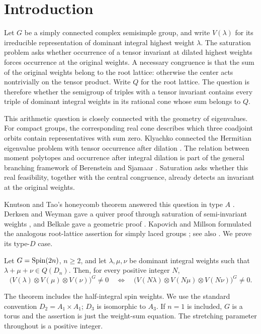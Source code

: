 \section{Introduction}\label{sec:introduction}

Let $G$ be a simply connected complex semisimple group, and write $V(\lambda)$
for its irreducible representation of dominant integral highest weight
$\lambda$. The saturation problem asks whether occurrence of a tensor
invariant at dilated highest weights forces occurrence at the original
weights. A necessary congruence is that the sum of the original weights
belong to the root lattice: otherwise the center acts nontrivially on the
tensor product. Write $Q$ for the root lattice. The question is therefore
whether the semigroup of triples with a tensor invariant contains every
triple of dominant integral weights in its rational cone whose sum
belongs to $Q$.

This arithmetic question is closely connected with the geometry of
eigenvalues. For compact groups, the corresponding real cone describes
which three coadjoint orbits contain representatives with sum zero.
Klyachko connected the Hermitian eigenvalue problem with tensor
occurrence after dilation \cite{Kly98}. The relation between moment
polytopes and occurrence after integral
dilation is part of the general branching framework of Berenstein and
Sjamaar \cite[Theorems~3.2.1--3.2.2]{BS00}. Saturation asks whether this
real feasibility, together with the central congruence, already detects
an invariant at the original weights.

Knutson and Tao's honeycomb theorem answered this question in type $A$
\cite{KT99}. Derksen and Weyman gave a quiver proof through saturation
of semi-invariant weights \cite{DW00}, and Belkale gave a geometric
proof \cite{Bel06}. Kapovich and Millson formulated the analogous root-lattice
assertion for simply laced groups
\cite[Conjecture~1.4(1)]{KM06}; see also
\cite[Conjecture~1.5]{KKM09}. We prove its type-$D$ case.

\begin{theorem}\label{thm:main}
Let $G=\operatorname{Spin}(2n)$, $n\ge2$, and let $\lambda,\mu,\nu$ be dominant
integral weights such that $\lambda+\mu+\nu\in Q(D_n)$. Then, for every
positive integer $N$,
\[
 \bigl(V(\lambda)\otimes V(\mu)\otimes V(\nu)\bigr)^G\ne0
 \quad\Longleftrightarrow\quad
 \bigl(V(N\lambda)\otimes V(N\mu)\otimes V(N\nu)\bigr)^G\ne0.
\]
\end{theorem}

The theorem includes the half-integral spin weights. We use the standard
convention $D_2=A_1\times A_1$; $D_3$ is isomorphic to $A_3$. If $n=1$
is included, $G$ is a torus and the assertion is just the weight-sum
equation. The stretching parameter throughout is a positive integer.

